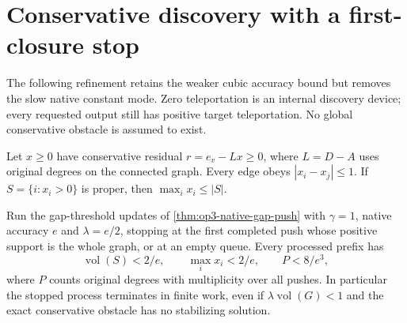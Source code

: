 \section{Conservative discovery with a first-closure stop}
\label{sec:op3-conservative-local-producer}

The following refinement retains the weaker cubic accuracy bound but
removes the slow native constant mode. Zero teleportation is an internal
discovery device; every requested output still has positive target
teleportation. No global conservative obstacle is assumed to exist.

\begin{lemma}
\label{lem:op3-conservative-prefix-bounds}
Let $x\geq0$ have conservative residual $r=e_v-Lx\geq0$, where
$L=D-A$ uses original degrees on the connected graph. Every edge obeys
$|x_i-x_j|\leq1$. If $S=\{i:x_i>0\}$ is proper, then
$\max_i x_i\leq|S|$.

Run the gap-threshold updates of \cref{thm:op3-native-gap-push} with
$\gamma=1$, native accuracy $e$ and $\lambda=e/2$, stopping at the
first completed push whose positive support is the whole graph, or at
an empty queue. Every processed prefix has
\[
 \operatorname{vol}(S)<2/e,\qquad
 \max_i x_i<2/e,\qquad
 P<8/e^3,
\]
where $P$ counts original degrees with multiplicity over all pushes.
In particular the stopped process terminates in finite work, even if
$\lambda\operatorname{vol}(G)<1$ and the exact conservative obstacle
has no stabilizing solution.
\end{lemma}
